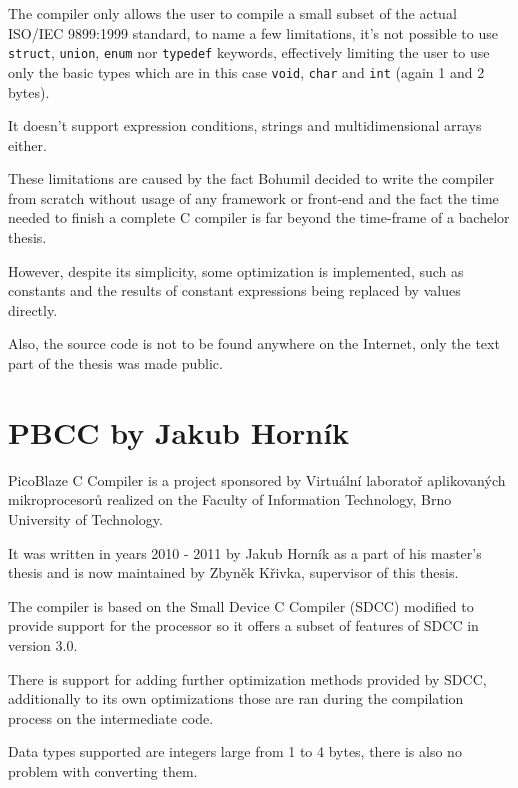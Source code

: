     The compiler only allows the user to compile a
    small subset of the actual ISO/IEC 9899:1999 standard,
    to name a few limitations, it's not possible to use
    \texttt{struct}, \texttt{union}, \texttt{enum} nor \texttt{typedef} keywords,
    effectively limiting the user to use only the basic types which are in this case \texttt{void}, \texttt{char} and \texttt{int} (again 1 and 2 bytes).

    It doesn't support expression conditions, strings and multidimensional arrays either.

    These limitations are caused by the fact Bohumil decided to write the compiler
    from scratch without usage of any framework or front-end and the fact the time needed to finish a complete C compiler is far beyond the time-frame of a bachelor thesis.

    However, despite its simplicity, some optimization is implemented, 
    such as constants and the results of constant expressions being replaced by values directly.

    Also, the source code is not to be found anywhere on the Internet, only the text part of the thesis was made public.


    \section{PBCC by Jakub Horník}\label{prev_pbcc}


    PicoBlaze C Compiler is a project sponsored by Virtuální laboratoř aplikovaných mikroprocesorů %
    realized on the Faculty of Information Technology, Brno University of Technology.

    It was written in years 2010 - 2011 by Jakub Horník as a part of his master's thesis and is now maintained by Zbyněk Křivka, supervisor of this thesis.

    The compiler is based on the Small Device C Compiler (SDCC) modified to provide support for the processor so it offers a subset of features of SDCC in version 3.0.

    There is support for adding further optimization methods provided by SDCC, additionally to its own optimizations those are ran during the compilation process on the intermediate code.

    Data types supported are integers large from 1 to 4 bytes, there is also no problem with converting them.

